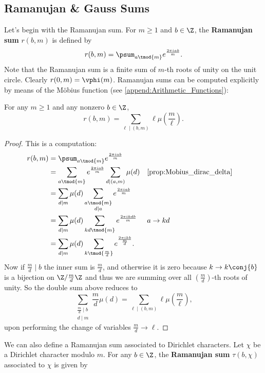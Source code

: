       \subsection*{Ramanujan \& Gauss Sums}
        Let's begin with the Ramanujan sum. For $m \ge 1$ and $b \in \Z$, the \textbf{Ramanujan sum} $r(b,m)$ is defined by
        \[
          r(b,m) = \psum_{a \tmod{m}}e^{\frac{2\pi iab}{m}}.
        \]
        Note that the Ramanujan sum is a finite sum of $m$-th roots of unity on the unit circle. Clearly $r(0,m) = \vphi(m)$. Ramanujan sums can be computed explicitly by means of the M\"obius function (see \cref{append:Arithmetic_Functions}):

        \begin{proposition}\label{prop:Ramanujan_sum_evaluation}
          For any $m \ge 1$ and any nonzero $b \in \Z$,
          \[
            r(b,m) = \sum_{\ell \mid (b,m)}\ell\mu\left(\frac{m}{\ell}\right).
          \]
        \end{proposition}
        \begin{proof}
          This is a computation:
          \begin{align*}
            r(b,m) &= \psum_{a \tmod{m}}e^{\frac{2\pi iab}{m}} \\
            &= \sum_{a \tmod{m}}e^{\frac{2\pi iab}{m}}\sum_{d \mid (a,m)}\mu(d) && \text{\cref{prop:Mobius_dirac_delta}} \\
            &= \sum_{d \mid m}\mu(d)\sum_{\substack{a \tmod{m} \\ d \mid a}}e^{\frac{2\pi iab}{m}} \\
            &= \sum_{d \mid m}\mu(d)\sum_{kd \tmod{m}}e^{\frac{2\pi ikdb}{m}} && \text{$a \to kd$} \\
            &= \sum_{d \mid m}\mu(d)\sum_{k \tmod{\frac{m}{d}}}e^{\frac{2\pi ik b}{\frac{m}{d}}}.
          \end{align*}
          Now if $\frac{m}{d} \mid b$ the inner sum is $\frac{m}{d}$, and otherwise it is zero because $k \to k\conj{b}$ is a bijection on $\Z/\frac{m}{d}\Z$ and thus we are summing over all $\left(\frac{m}{d}\right)$-th roots of unity. So the double sum above reduces to
          \[
            \sum_{\substack{\frac{m}{d} \mid b \\ d \mid m}}\frac{m}{d}\mu(d) = \sum_{\ell \mid (b,m)}\ell\mu\left(\frac{m}{\ell}\right),
          \]
          upon performing the change of variables $\frac{m}{d} \to \ell$.
        \end{proof}
        We can also define a Ramanujan sum associated to Dirichlet characters. Let $\chi$ be a Dirichlet character modulo $m$. For any $b \in \Z$, the \textbf{Ramanujan sum} $\tau(b,\chi)$ associated to $\chi$ is given by
